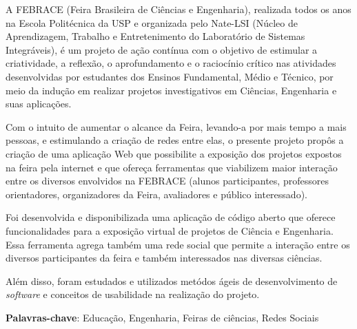 
\begin{resumo}

A FEBRACE (Feira Brasileira de Ciências e Engenharia), realizada todos os anos na Escola Politécnica da USP e organizada pelo Nate-LSI (Núcleo de Aprendizagem, Trabalho e Entretenimento do Laboratório de Sistemas Integráveis), é um projeto de ação contínua com o objetivo de estimular a criatividade, a reflexão, o aprofundamento e o raciocínio crítico nas atividades desenvolvidas por estudantes dos Ensinos Fundamental, Médio e Técnico, por meio da indução em realizar projetos investigativos em Ciências, Engenharia e suas aplicações.

Com o intuito de aumentar o alcance da Feira, levando-a por mais tempo a mais pessoas, e estimulando a criação de redes entre elas, o presente projeto propôs a criação de uma aplicação Web que possibilite a exposição dos projetos expostos na feira pela internet e que ofereça ferramentas que viabilizem maior interação entre os diversos envolvidos na FEBRACE (alunos participantes, professores orientadores, organizadores da Feira, avaliadores e público interessado).

Foi desenvolvida e disponibilizada uma aplicação de código aberto que oferece funcionalidades para a exposição virtual de projetos de Ciência e Engenharia. Essa ferramenta agrega também uma rede social que permite a interação entre os diversos participantes da feira e também interessados nas diversas ciências.

Além disso, foram estudados e utilizados metódos ágeis de desenvolvimento de \textit{software} e conceitos de usabilidade na realização do projeto.

\vspace{1.5ex}

{\bf Palavras-chave}: Educação, Engenharia, Feiras de ciências, Redes Sociais

\end{resumo}


